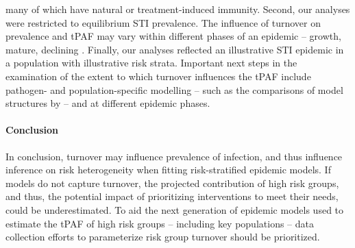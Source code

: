 many of which have natural or treatment-induced immunity.
Second, our analyses were restricted to equilibrium STI prevalence.
The influence of turnover on prevalence and tPAF
may vary within different phases of an epidemic
-- growth, mature, declining \citep{Wasserheit1996}.
Finally, our analyses reflected an illustrative STI epidemic
in a population with illustrative risk strata.
Important next steps in the examination of
the extent to which turnover influences the tPAF include
pathogen- and population-specific modelling
-- such as the comparisons of model structures by \citet{Hontelez2013,Johnson2016} --
and at different epidemic phases.
\paragraph{Conclusion}
In conclusion, turnover may influence prevalence of infection, and
thus influence inference on risk heterogeneity
when fitting risk-stratified epidemic models.
If models do not capture turnover,
the projected contribution of high risk groups, and thus,
the potential impact of prioritizing interventions to meet their needs, could be underestimated.
To aid the next generation of epidemic models
used to estimate the tPAF of high risk groups -- including key populations --
data collection efforts to parameterize risk group turnover should be prioritized.
